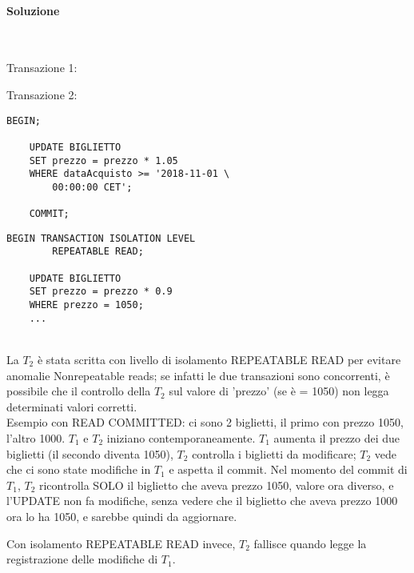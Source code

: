 \documentclass[a4paper, 10pt, titlepage]{article}
\begin{document}
\paragraph{Soluzione}\dotfill \medskip \\ 
\lstset{language=SQL}
\begin{minipage}{0.5\textwidth}
Transazione 1:
\end{minipage}
\begin{minipage}{0.5\textwidth}
Transazione 2:
\end{minipage}
\begin{footnotesize}
\begin{minipage}{0.49\textwidth}
\begin{lstlisting}[tabsize=2]
	BEGIN;

	UPDATE BIGLIETTO 
	SET prezzo = prezzo * 1.05
	WHERE dataAcquisto >= '2018-11-01 \
		00:00:00 CET';
	
	COMMIT;
\end{lstlisting}
\end{minipage}\vrule\hfill
\begin{minipage}{0.5\textwidth}
\begin{lstlisting}[tabsize=2]
	BEGIN TRANSACTION ISOLATION LEVEL 
		REPEATABLE READ;

	UPDATE BIGLIETTO 
	SET prezzo = prezzo * 0.9
	WHERE prezzo = 1050;
	...
\end{lstlisting}
\end{minipage}
\end{footnotesize}\medskip \\
La $T_2$ è stata scritta con livello di isolamento REPEATABLE READ per evitare anomalie Nonrepeatable reads; se infatti le due transazioni sono concorrenti, è possibile che il controllo della $T_2$ sul valore di 'prezzo' (se è = 1050) non legga determinati valori corretti. \medskip \\
Esempio con READ COMMITTED: ci sono 2 biglietti, il primo con prezzo 1050, l'altro 1000. $T_1$ e $T_2$ iniziano contemporaneamente. 
$T_1$ aumenta il prezzo dei due biglietti (il secondo diventa 1050), $T_2$ controlla i biglietti da modificare; $T_2$ vede che ci sono state modifiche in $T_1$ e aspetta il commit. Nel momento del commit di $T_1$, $T_2$ ricontrolla SOLO il biglietto che aveva prezzo 1050, valore ora diverso, e l'UPDATE non fa modifiche, senza vedere che il biglietto che aveva prezzo 1000 ora lo ha 1050, e sarebbe quindi da aggiornare.

Con isolamento REPEATABLE READ invece, $T_2$ fallisce quando legge la registrazione delle modifiche di $T_1$.
\end{document}
